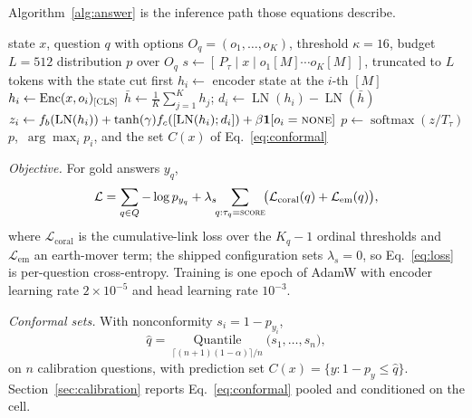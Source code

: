 Algorithm~\ref{alg:answer} is the inference path those equations describe.

\begin{algorithm}[t]
\caption{Answering one typed question with \vsix{}.}
\label{alg:answer}
\begin{algorithmic}[1]
\Require state $x$, question $q$ with options $O_q=(o_1,\dots,o_K)$, threshold $\kappa=16$, budget $L=512$
\Ensure distribution $p$ over $O_q$
  \State $s\gets[\,P_\tau\mid x\mid o_1[M]\cdots o_K[M]\,]$, truncated to $L$ tokens with the state cut first
  \State $h_i\gets$ encoder state at the $i$-th $[M]$ 
\Else
    \State $h_i\gets\operatorname{Enc}(x,o_i)_{\textsc{[CLS]}}$ 
  \EndFor
  \State $\bar h\gets\tfrac{1}{K}\sum_{j=1}^{K}h_j$; \quad $d_i\gets\operatorname{LN}(h_i)-\operatorname{LN}(\bar h)$
  \State $z_i\gets f_b(\operatorname{LN}(h_i))+\tanh(\gamma)f_c([\operatorname{LN}(h_i);d_i])+\beta\mathbf{1}[o_i=\textsc{none}]$
\EndIf
\State $p\gets\operatorname{softmax}(z/T_\tau)$ 
\State \Return $p$, \,$\arg\max_i p_i$, and the set $C(x)$ of Eq.~\eqref{eq:conformal}
\end{algorithmic}
\end{algorithm}

\emph{Objective.} For gold answers $y_q$,
\begin{multline}
\mathcal{L} = \sum_{q\in Q} -\log p_{y_q}
 + \lambda_s \!\!\sum_{q:\tau_q=\textsc{score}}\!\! \big(\mathcal{L}_{\text{coral}}(q)
 + \mathcal{L}_{\text{em}}(q)\big), \label{eq:loss}
\end{multline}
where $\mathcal{L}_{\text{coral}}$ is the cumulative-link loss over the $K_q-1$ ordinal thresholds
and $\mathcal{L}_{\text{em}}$ an earth-mover term; the shipped configuration sets $\lambda_s=0$, so
Eq.~\eqref{eq:loss} is per-question cross-entropy. Training is one epoch of AdamW with encoder
learning rate $2\times10^{-5}$ and head learning rate $10^{-3}$.

\emph{Conformal sets.} With nonconformity $s_i=1-p_{y_i}$,
\begin{equation}
\hat q = \operatorname*{Quantile}_{\lceil (n+1)(1-\alpha)\rceil/n}\big(s_1,\dots,s_n\big),
\label{eq:conformal}
\end{equation}
on $n$ calibration questions, with prediction set $C(x)=\{y:1-p_y\le\hat q\}$. Section~\ref{sec:calibration} reports
Eq.~\eqref{eq:conformal} pooled and conditioned on the cell.

